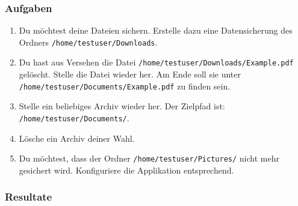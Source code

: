 \newpage
\subsubsection{Aufgaben}
\label{sec:org8253c40}

\begin{enumerate}
\item Du möchtest deine Dateien sichern. Erstelle dazu eine Datensicherung des Ordners \texttt{/home/testuser/Downloads}.
\item Du hast aus Versehen die Datei
  \texttt{/home/testuser/Downloads/Example.pdf} gelöscht. Stelle die Datei
  wieder her.\newline
  Am Ende soll sie unter \texttt{/home/testuser/Documents/Example.pdf} zu finden sein.
\item Stelle ein beliebiges Archiv wieder her.\newline
  Der Zielpfad ist: \texttt{/home/testuser/Documents/}.
\item Lösche ein Archiv deiner Wahl.
\item Du möchtest, dass der Ordner \texttt{/home/testuser/Pictures/} nicht mehr gesichert
wird. Konfiguriere die Applikation entsprechend.
\end{enumerate}

\newpage
\subsubsection{Resultate}
\label{sec:org18050af}

